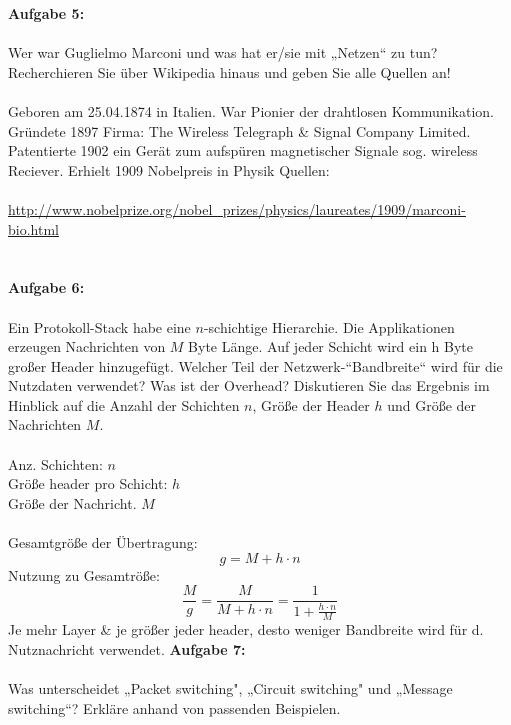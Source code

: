 \documentclass[12pt,a4paper]{report}
\theoremstyle{definition}
\begin{document}
\textbf{Aufgabe 5:}
\\
\\
Wer war Guglielmo Marconi und was hat er/sie mit „Netzen“ zu tun? Recherchieren Sie über
Wikipedia hinaus und geben Sie alle Quellen an!\\
\\
Geboren am 25.04.1874 in Italien. War Pionier der drahtlosen Kommunikation.
Gründete 1897 Firma: The Wireless Telegraph \& Signal Company Limited.
Patentierte 1902 ein Gerät zum aufspüren magnetischer Signale sog. wireless Reciever. Erhielt 1909 Nobelpreis in Physik
Quellen:\\
\\
\url{http://www.nobelprize.org/nobel_prizes/physics/laureates/1909/marconi-bio.html}\\
\\
\\
\textbf{Aufgabe 6:}
\\
\\
Ein Protokoll-Stack habe eine $n$-schichtige Hierarchie. Die Applikationen erzeugen Nachrichten
von $M$ Byte Länge. Auf jeder Schicht wird ein h Byte großer Header hinzugefügt. Welcher Teil der
Netzwerk-“Bandbreite“ wird für die Nutzdaten verwendet? Was ist der Overhead? Diskutieren Sie
das Ergebnis im Hinblick auf die Anzahl der Schichten $n$, Größe der Header $h$ und Größe der
Nachrichten $M$.\\
\\
Anz. Schichten: $n$\\
Größe header pro Schicht: $h$\\
Größe der Nachricht. $M$\\
\\
Gesamtgröße der Übertragung:
\[
g=M+h\cdot n
\]
Nutzung zu Gesamtröße:
\[
\frac{M}{g}=\frac{M}{M+h\cdot n}= \frac{1}{1+\frac{h\cdot n}{M}}
\]
Je mehr Layer \& je größer jeder header, desto weniger Bandbreite wird für d. Nutznachricht verwendet.
\newpage
\textbf{Aufgabe 7:}
\\
\\
Was unterscheidet „Packet switching", „Circuit switching" und „Message switching“? Erkläre anhand von passenden Beispielen.
\\
\end{document}
